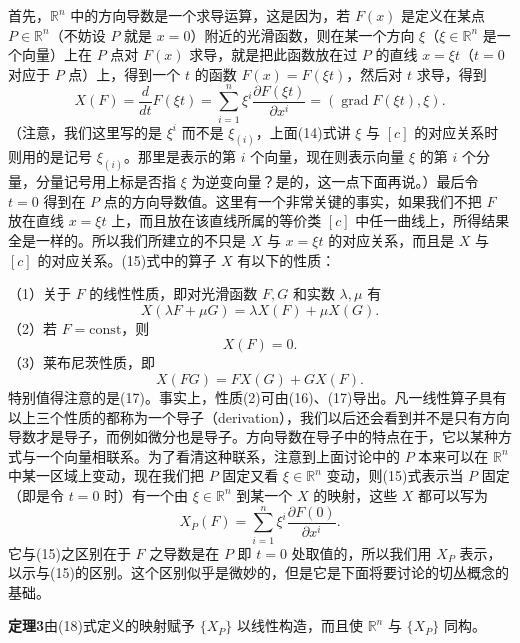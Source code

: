 首先，$\mathbb R^n$ 中的方向导数是一个求导运算，这是因为，若 $F(x)$ 是定义在某点 $P\in\mathbb R^n$（不妨设 $P$ 就是 $x=0$）附近的光滑函数，则在某一个方向 $\xi$（$\xi\in\mathbb R^n$ 是一个向量）上在 $P$ 点对 $F(x)$ 求导，就是把此函数放在过 $P$ 的直线 $x=\xi t$（$t=0$ 对应于 $P$ 点）上，得到一个 $t$ 的函数 $F(x)=F(\xi t)$，然后对 $t$ 求导，得到
\begin{equation}
 X(F)=\frac{d}{dt}F(\xi t)
 =\sum_{i=1}^n\xi^i\frac{\partial F(\xi t)}{\partial x^i}
 =(\operatorname{grad}F(\xi t),\xi).
 \tag{15}
\end{equation}
（注意，我们这里写的是 $\xi^i$ 而不是 $\xi_{(i)}$，上面(14)式讲 $\xi$ 与 $[c]$ 的对应关系时则用的是记号 $\xi_{(i)}$。那里是表示的第 $i$ 个向量，现在则表示向量 $\xi$ 的第 $i$ 个分量，分量记号用上标是否指 $\xi$ 为逆变向量？是的，这一点下面再说。）最后令 $t=0$ 得到在 $P$ 点的方向导数值。这里有一个非常关键的事实，如果我们不把 $F$ 放在直线 $x=\xi t$ 上，而且放在该直线所属的等价类 $[c]$ 中任一曲线上，所得结果全是一样的。所以我们所建立的不只是 $X$ 与 $x=\xi t$ 的对应关系，而且是 $X$ 与 $[c]$ 的对应关系。(15)式中的算子 $X$ 有以下的性质：

（1）关于 $F$ 的线性性质，即对光滑函数 $F,G$ 和实数 $\lambda,\mu$ 有
\begin{equation}
 X(\lambda F+\mu G)=\lambda X(F)+\mu X(G).
 \tag{16}
\end{equation}
（2）若 $F=\mathrm{const}$，则
\[
 X(F)=0.
\]
（3）莱布尼茨性质，即
\begin{equation}
 X(FG)=F X(G)+G X(F).
 \tag{17}
\end{equation}
特别值得注意的是(17)。事实上，性质(2)可由(16)、(17)导出。凡一线性算子具有以上三个性质的都称为一个导子（derivation），我们以后还会看到并不是只有方向导数才是导子，而例如微分也是导子。方向导数在导子中的特点在于，它以某种方式与一个向量相联系。为了看清这种联系，注意到上面讨论中的 $P$ 本来可以在 $\mathbb R^n$ 中某一区域上变动，现在我们把 $P$ 固定又看 $\xi\in\mathbb R^n$ 变动，则(15)式表示当 $P$ 固定（即是令 $t=0$ 时）有一个由 $\xi\in\mathbb R^n$ 到某一个 $X$ 的映射，这些 $X$ 都可以写为
\begin{equation}
 X_P(F)=\sum_{i=1}^n\xi^i\frac{\partial F(0)}{\partial x^i}.
 \tag{18}
\end{equation}
它与(15)之区别在于 $F$ 之导数是在 $P$ 即 $t=0$ 处取值的，所以我们用 $X_P$ 表示，以示与(15)的区别。这个区别似乎是微妙的，但是它是下面将要讨论的切丛概念的基础。

\noindent\textbf{定理3}\quad 由(18)式定义的映射赋予 $\{X_P\}$ 以线性构造，而且使 $\mathbb R^n$ 与 $\{X_P\}$ 同构。

